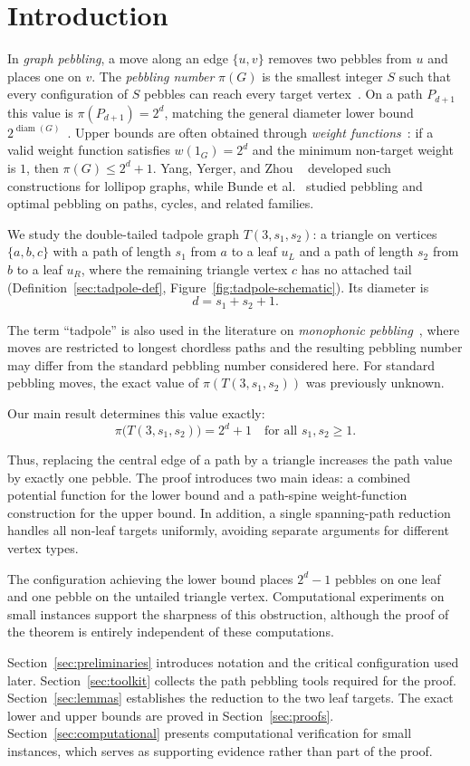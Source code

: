 
\section{Introduction}\label{sec:intro}

In \emph{graph pebbling}, a move along an edge $\{u,v\}$ removes two pebbles
from $u$ and places one on $v$. The \emph{pebbling number} $\pi(G)$ is the
smallest integer $S$ such that every configuration of $S$ pebbles can reach
every target vertex~\cite{Chung1989,Hurlbert1999}. On a path $P_{d+1}$ this
value is $\pi(P_{d+1})=2^d$, matching the general diameter lower bound
$2^{\operatorname{diam}(G)}$~\cite{AlconHurlbert2022}. Upper bounds are
often obtained through \emph{weight functions}~\cite{Hurlbert2017}: if a
valid weight function satisfies $w(1_G)=2^d$ and the minimum non-target
weight is $1$, then $\pi(G)\leq 2^d+1$. Yang, Yerger, and Zhou
~\cite{YYZ2024} developed such constructions for lollipop graphs, while
Bunde et al.~\cite{Bunde2008} studied pebbling and optimal pebbling on paths,
cycles, and related families.

We study the double-tailed tadpole graph $T(3,s_1,s_2)$: a triangle on
vertices $\{a,b,c\}$ with a path of length $s_1$ from $a$ to a leaf $u_L$
and a path of length $s_2$ from $b$ to a leaf $u_R$, where the remaining
triangle vertex $c$ has no attached tail
(Definition~\ref{sec:tadpole-def}, Figure~\ref{fig:tadpole-schematic}).
Its diameter is
\[
d=s_1+s_2+1.
\]

The term ``tadpole'' is also used in the literature on
\emph{monophonic pebbling}~\cite{Iammal2026}, where moves are restricted to
longest chordless paths and the resulting pebbling number may differ from the
standard pebbling number considered here. For standard pebbling moves,
the exact value of $\pi(T(3,s_1,s_2))$ was previously unknown.

Our main result determines this value exactly:
\[
\pi\bigl(T(3,s_1,s_2)\bigr)=2^d+1
\quad\text{for all }s_1,s_2\geq1.
\]

Thus, replacing the central edge of a path by a triangle increases the path
value by exactly one pebble. The proof introduces two main ideas: a combined
potential function for the lower bound and a path-spine weight-function
construction for the upper bound. In addition, a single spanning-path
reduction handles all non-leaf targets uniformly, avoiding separate
arguments for different vertex types.

The configuration achieving the lower bound places $2^d-1$ pebbles on one
leaf and one pebble on the untailed triangle vertex. Computational
experiments on small instances support the sharpness of this obstruction,
although the proof of the theorem is entirely independent of these
computations.

Section~\ref{sec:preliminaries} introduces notation and the critical
configuration used later. Section~\ref{sec:toolkit} collects the path
pebbling tools required for the proof. Section~\ref{sec:lemmas} establishes
the reduction to the two leaf targets. The exact lower and upper bounds are
proved in Section~\ref{sec:proofs}. Section~\ref{sec:computational}
presents computational verification for small instances, which serves as
supporting evidence rather than part of the proof.